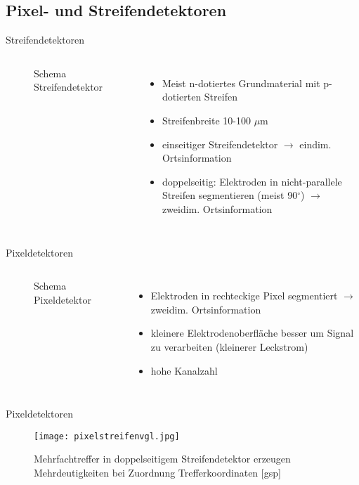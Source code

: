 \subsection[]{Pixel- und Streifendetektoren}


\begin{frame}{Streifendetektoren}
	\begin{columns}[T]
			\begin{figure}[htbp]
			  \centering
			   
			  \caption{Schema Streifendetektor}
			\end{figure}
	    	\begin{itemize}
			  \item Meist n-dotiertes Grundmaterial mit p-dotierten Streifen
			  \item Streifenbreite 10-100 $\mu$m
			  \item einseitiger Streifendetektor $\rightarrow$ eindim. Ortsinformation
			  \item doppelseitig: Elektroden in nicht-parallele Streifen segmentieren (meist 90$^\circ$)
			  $\rightarrow$ zweidim. Ortsinformation
			\end{itemize}
    \end{columns}
\end{frame}

\begin{frame}{Pixeldetektoren}
	\begin{columns}[T]
			\begin{figure}[htbp]
			  \centering
			  
			  \caption{Schema Pixeldetektor}
			\end{figure}	
	    	\begin{itemize}
			  \item Elektroden in rechteckige Pixel segmentiert $\rightarrow$ zweidim. Ortsinformation
			  \item kleinere Elektrodenoberfläche besser um Signal zu verarbeiten (kleinerer Leckstrom)
			  \item hohe Kanalzahl
			\end{itemize}
    \end{columns}
\end{frame}


\begin{frame}{Pixeldetektoren}
			\begin{figure}[htbp]
			  \centering
			  \texttt{[image: pixelstreifenvgl.jpg]}
			  \caption{Mehrfachtreffer in doppelseitigem Streifendetektor erzeugen Mehrdeutigkeiten bei Zuordnung
			Trefferkoordinaten [gsp]}
			\end{figure}	
\end{frame}


